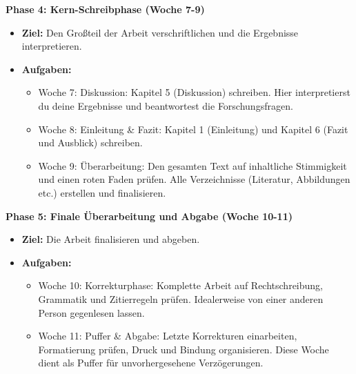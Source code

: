 \textbf{Phase 4: Kern-Schreibphase (Woche 7-9)}
\begin{itemize}[leftmargin=*, noitemsep]
	\item\textbf{Ziel:} Den Großteil der Arbeit verschriftlichen und die Ergebnisse interpretieren.
	\item\textbf{Aufgaben:}
	      \begin{itemize}[noitemsep]
		      \item Woche 7: Diskussion: Kapitel 5 (Diskussion) schreiben. Hier interpretierst du deine Ergebnisse und beantwortest die Forschungsfragen.
		      \item Woche 8: Einleitung \& Fazit: Kapitel 1 (Einleitung) und Kapitel 6 (Fazit und Ausblick) schreiben.
		      \item Woche 9: Überarbeitung: Den gesamten Text auf inhaltliche Stimmigkeit und einen roten Faden prüfen. Alle Verzeichnisse (Literatur, Abbildungen etc.) erstellen und finalisieren.
	      \end{itemize}
\end{itemize}

\textbf{Phase 5: Finale Überarbeitung und Abgabe (Woche 10-11)}
\begin{itemize}[leftmargin=*, noitemsep]
	\item\textbf{Ziel:} Die Arbeit finalisieren und abgeben.
	\item\textbf{Aufgaben:}
	      \begin{itemize}[noitemsep]
		      \item Woche 10: Korrekturphase: Komplette Arbeit auf Rechtschreibung, Grammatik und Zitierregeln prüfen. Idealerweise von einer anderen Person gegenlesen lassen.
		      \item Woche 11: Puffer \& Abgabe: Letzte Korrekturen einarbeiten, Formatierung prüfen, Druck und Bindung organisieren. Diese Woche dient als Puffer für unvorhergesehene Verzögerungen.
	      \end{itemize}
\end{itemize}


